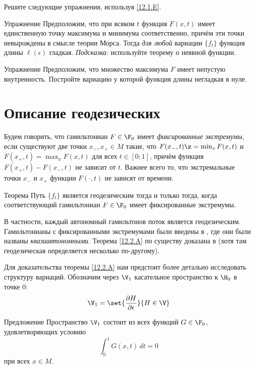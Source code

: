 Решите следующие упражнения, используя \ref{12.1.E}.

\begin{ex}{Упражнение}\label{12.1.F}
Предположим, что при всяком $t$ функция $F(x, t)$ имеет единственную точку максимума и минимума соответственно, причём эти точки невырождены в смысле теории Морса.
Тогда \textit{для любой} вариации $\{f_t\}$ функция длины $\ell(\epsilon)$ гладкая.
\emph{Подсказка:} используйте теорему о неявной функции.
\end{ex}

\begin{ex}{Упражнение}\label{12.1.G}
Предположим, что множество максимума $F$ имеет непустую внутренность.
Постройте вариацию у которой функция длины негладкая в нуле.
\end{ex}

\section{Описание геодезических}\label{sec:12.2}

Будем говорить, что гамильтониан $F\in \F_0$ имеет \emph{фиксированные экстремумы}, если существуют две точки $x_-, x_+\in M$ такие, что $F(x_-, t) \z= \min_x F(x, t)$ и $F(x_+, t) = \max_x F (x, t)$ для всех $t\in[0; 1]$, причём функция $F(x_+, t) - F(x_-, t)$ не зависит от $t$.
Важнее всего то, что экстремальные точки $x_-$ и $x_+$ функции $F(\cdot, t)$ не зависят от времени.

\begin{thm}{Теорема}\label{12.2.A}
Путь $\{f_t\}$ является геодезическим тогда и только тогда, когда соответствующий гамильтониан $F\in\F_0$ имеет фиксированные экстремумы.
\end{thm}

В частности, каждый автономный гамильтонов поток является геодезическим.
Гамильтонианы с фиксированными экстремумами были введены в \cite{BP1}, где они были названы \emph{квазиавтономными}.
Теорема \ref{12.2.A} по существу доказана в \cite{LM2} (хотя там геодезическая определяется несколько по-другому).

Для доказательства теоремы \ref{12.2.A} нам предстоит более детально исследовать структуру вариаций.
Обозначим через $\V_1$ касательное пространство к $\H_0$ в точке $0$: 
\[\V_1=\set{\frac{\partial H}{\partial\epsilon}}{H\in \V}\]

\begin{thm}{Предложение}\label{12.2.B}
Пространство $\V_1$ состоит из всех функций $G\in\F_0$, удовлетворяющих условию
\[\int_0^1G(x,t)\,dt=0\]
при всех $x\in M$.
\end{thm}

